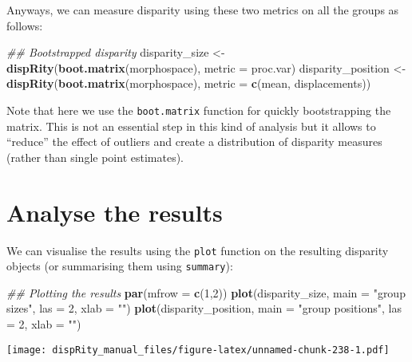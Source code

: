 \documentclass[
]{book}
\newenvironment{Shaded}{\begin{snugshade}}{\end{snugshade}}
\newcommand{\CommentTok}[1]{\textcolor[rgb]{0.56,0.35,0.01}{\textit{#1}}}
\newcommand{\DataTypeTok}[1]{\textcolor[rgb]{0.13,0.29,0.53}{#1}}
\newcommand{\DecValTok}[1]{\textcolor[rgb]{0.00,0.00,0.81}{#1}}
\newcommand{\KeywordTok}[1]{\textcolor[rgb]{0.13,0.29,0.53}{\textbf{#1}}}
\newcommand{\NormalTok}[1]{#1}
\newcommand{\StringTok}[1]{\textcolor[rgb]{0.31,0.60,0.02}{#1}}
\begin{document}
Anyways, we can measure disparity using these two metrics on all the groups as follows:

\begin{Shaded}
\begin{Highlighting}[]
\CommentTok{\#\# Bootstrapped disparity}
\NormalTok{disparity\_size \textless{}{-}}\StringTok{  }\KeywordTok{dispRity}\NormalTok{(}\KeywordTok{boot.matrix}\NormalTok{(morphospace), }\DataTypeTok{metric =}\NormalTok{ proc.var)}
\NormalTok{disparity\_position \textless{}{-}}\StringTok{ }\KeywordTok{dispRity}\NormalTok{(}\KeywordTok{boot.matrix}\NormalTok{(morphospace), }\DataTypeTok{metric =} \KeywordTok{c}\NormalTok{(mean, displacements))}
\end{Highlighting}
\end{Shaded}

Note that here we use the \texttt{boot.matrix} function for quickly bootstrapping the matrix.
This is not an essential step in this kind of analysis but it allows to ``reduce'' the effect of outliers and create a distribution of disparity measures (rather than single point estimates).

\hypertarget{analyse-the-results}{%
\section{Analyse the results}\label{analyse-the-results}}

We can visualise the results using the \texttt{plot} function on the resulting disparity objects (or summarising them using \texttt{summary}):

\begin{Shaded}
\begin{Highlighting}[]
\CommentTok{\#\# Plotting the results}
\KeywordTok{par}\NormalTok{(}\DataTypeTok{mfrow =} \KeywordTok{c}\NormalTok{(}\DecValTok{1}\NormalTok{,}\DecValTok{2}\NormalTok{))}
\KeywordTok{plot}\NormalTok{(disparity\_size, }\DataTypeTok{main =} \StringTok{"group sizes"}\NormalTok{, }\DataTypeTok{las =} \DecValTok{2}\NormalTok{, }\DataTypeTok{xlab =} \StringTok{""}\NormalTok{)}
\KeywordTok{plot}\NormalTok{(disparity\_position, }\DataTypeTok{main =} \StringTok{"group positions"}\NormalTok{, }\DataTypeTok{las =} \DecValTok{2}\NormalTok{, }\DataTypeTok{xlab =} \StringTok{""}\NormalTok{)}
\end{Highlighting}
\end{Shaded}

\texttt{[image: dispRity\_manual\_files/figure-latex/unnamed-chunk-238-1.pdf]}
\end{document}
